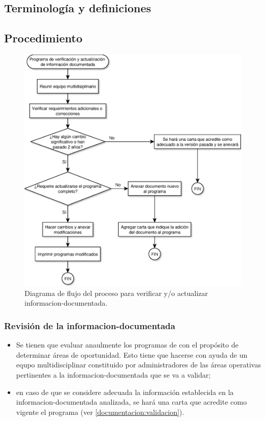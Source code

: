 \subsection{Terminología y definiciones}
\begin{description}
\end{description}

\subsection{Procedimiento}
\begin{figure}[htb]
    \centering
    \includegraphics[width=0.5\linewidth]{src/diagramas/G1_AV1.eps}
    \caption{Diagrama de flujo del proceso para verificar y/o actualizar \gls{informacion-documentada}.}
\end{figure}

\subsubsection{Revisión de la \gls{informacion-documentada}}
\label{documentacion:revision}
\begin{itemize}
\item Se tienen que evaluar anaulmente los programas de  con el propósito de determinar áreas de oportunidad. Esto tiene que hacerse con ayuda de un equpo multidisciplinar constituido por administradores de las áreas operativas pertinentes a la \gls{informacion-documentada} que se va a validar;
\item en caso de que se considere adecuada la información establecida en la \gls{informacion-documentada} analizada, se hará una carta que acredite como vigente el programa (ver \cref{documentacion:validacion}).
\end{itemize}

